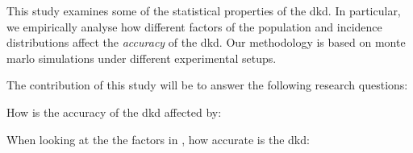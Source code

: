 This study examines some of the statistical properties of the \gls{dkd}.
In particular,
we empirically analyse how different factors of the population and incidence distributions
affect the \textit{accuracy} of the \gls{dkd}.
Our methodology is based on monte marlo simulations under different experimental setups.

The contribution of this study will be to answer the following research questions:

\begin{question}
    \label{thm:accuracy-affected}
    How is the accuracy of the \gls{dkd} affected by:
\end{question}

\begin{question}
    \label{thm:accuracy-scale}
    When looking at the the factors in ,
    how accurate is the \gls{dkd}:
\end{question}


